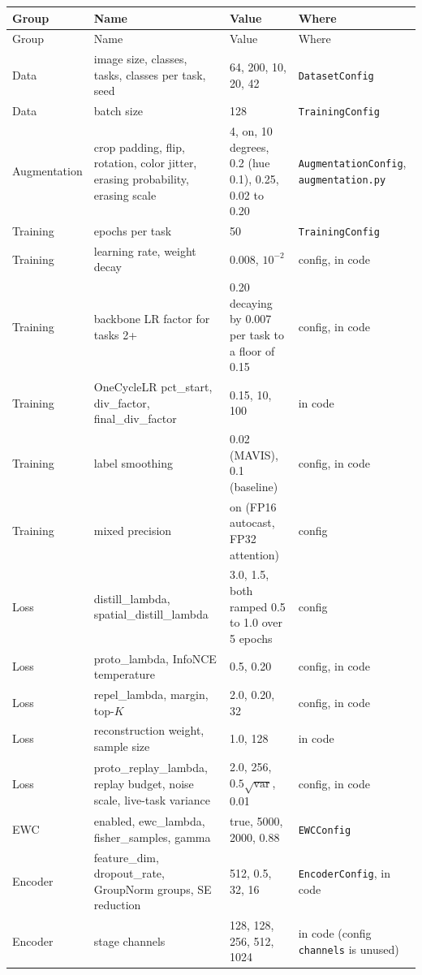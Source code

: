\documentclass[11pt,a4paper]{article}
\newcommand{\code}[1]{\texttt{#1}}
\begin{document}
\begin{longtable}{L{2cm} L{5.2cm} L{4.4cm} L{3.4cm}}
\toprule
Group & Name & Value & Where \\
\midrule
\endfirsthead
\toprule
Group & Name & Value & Where \\
\midrule
\endhead
\bottomrule
\endfoot
Data & image size, classes, tasks, classes per task, seed & 64, 200, 10, 20, 42 & \code{DatasetConfig} \\
Data & batch size & 128 & \code{TrainingConfig} \\
Augmentation & crop padding, flip, rotation, color jitter, erasing probability, erasing scale & 4, on, 10 degrees, 0.2 (hue 0.1), 0.25, 0.02 to 0.20 & \code{AugmentationConfig}, \code{augmentation.py} \\
Training & epochs per task & 50 & \code{TrainingConfig} \\
Training & learning rate, weight decay & 0.008, $10^{-2}$ & config, in code \\
Training & backbone LR factor for tasks 2+ & 0.20 decaying by 0.007 per task to a floor of 0.15 & config, in code \\
Training & OneCycleLR pct\_start, div\_factor, final\_div\_factor & 0.15, 10, 100 & in code \\
Training & label smoothing & 0.02 (MAVIS), 0.1 (baseline) & config, in code \\
Training & mixed precision & on (FP16 autocast, FP32 attention) & config \\
Loss & distill\_lambda, spatial\_distill\_lambda & 3.0, 1.5, both ramped 0.5 to 1.0 over 5 epochs & config \\
Loss & proto\_lambda, InfoNCE temperature & 0.5, 0.20 & config, in code \\
Loss & repel\_lambda, margin, top-$K$ & 2.0, 0.20, 32 & config, in code \\
Loss & reconstruction weight, sample size & 1.0, 128 & in code \\
Loss & proto\_replay\_lambda, replay budget, noise scale, live-task variance & 2.0, 256, $0.5\sqrt{\mathrm{var}}$, 0.01 & config, in code \\
EWC & enabled, ewc\_lambda, fisher\_samples, gamma & true, 5000, 2000, 0.88 & \code{EWCConfig} \\
Encoder & feature\_dim, dropout\_rate, GroupNorm groups, SE reduction & 512, 0.5, 32, 16 & \code{EncoderConfig}, in code \\
Encoder & stage channels & 128, 128, 256, 512, 1024 & in code (config \code{channels} is unused) \\

\end{longtable}
\end{document}
